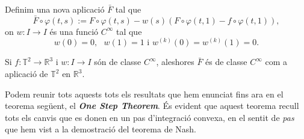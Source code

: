 
Definim una nova aplicació $\bar F$ tal que
\begin{equation}
    \label{eq:def_barF}
    \bar F\circ\varphi(t,s) := F\circ\varphi(t,s) - w(s)(F\circ\varphi(t,1)-f\circ\varphi(t,1)),
\end{equation}
on $w:I\to I$ és una funció $C^\infty$ tal que 
\begin{equation*}
    w(0)=0, \text{ } w(1)=1 \text{ i } w^{(k)}(0)=w^{(k)}(1)=0.
\end{equation*}
\begin{lema}
    \label{lema:lema8}
    Si $f:\mathbb T^2\to\mathbb R^3$ i $w:I\to I$ són de classe $C^\infty$, aleshores $\bar F$ és de classe $C^\infty$ com a aplicació de $\mathbb T^2$ en $\mathbb R^3$.
\end{lema}
Podem reunir tots aquests tots els resultats que hem enunciat fins ara en el teorema següent, el \textbf{\textit{One Step Theorem}}. És evident que aquest teorema recull tots els canvis que es donen en un pas d'integració convexa, en el sentit de \textit{pas} que hem vist a la demostració del teorema de Nash.
